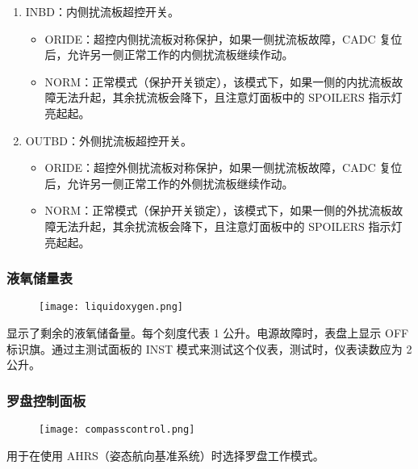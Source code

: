 \begin{enumerate}
	\item INBD：内侧扰流板超控开关。
	      \begin{itemize}
		      \item ORIDE：超控内侧扰流板对称保护，如果一侧扰流板故障，CADC 复位后，允许另一侧正常工作的内侧扰流板继续作动。
		      \item NORM：正常模式（保护开关锁定），该模式下，如果一侧的内扰流板故障无法升起，其余扰流板会降下，且注意灯面板中的 SPOILERS 指示灯亮起起。
	      \end{itemize}
	\item OUTBD：外侧扰流板超控开关。
	      \begin{itemize}
		      \item ORIDE：超控外侧扰流板对称保护，如果一侧扰流板故障，CADC 复位后，允许另一侧正常工作的外侧扰流板继续作动。
		      \item NORM：正常模式（保护开关锁定），该模式下，如果一侧的外扰流板故障无法升起，其余扰流板会降下，且注意灯面板中的 SPOILERS 指示灯亮起起。
	      \end{itemize}
\end{enumerate}

\subsubsection{液氧储量表}

\begin{figure}[htb]
	\centering
	\texttt{[image: liquidoxygen.png]}
\end{figure}
显示了剩余的液氧储备量。每个刻度代表 1 公升。电源故障时，表盘上显示 OFF 标识旗。通过主测试面板的 INST 模式来测试这个仪表，测试时，仪表读数应为 2 公升。

\subsubsection{罗盘控制面板}

\begin{figure}[htb]
	\centering
	\texttt{[image: compasscontrol.png]}
\end{figure}
用于在使用 AHRS（姿态航向基准系统）时选择罗盘工作模式。

